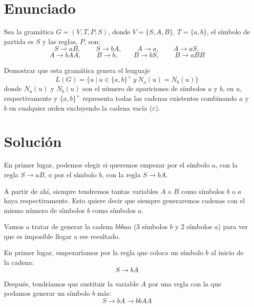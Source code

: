 \documentclass[10pt,a4paper,spanish]{report}
\begin{document}
\section{\textcolor{p1}Enunciado}
Sea la gramática $G = (V,T,P,S)$, donde $V = \{S,A,B\}$, $T = \{a,b\}$, el símbolo de partida es $S$ y las reglas, $P$, son:
\begin{displaymath}
S \rightarrow aB, \qquad\ S \rightarrow bA, \qquad\ A \rightarrow a, \qquad A \rightarrow aS,
\end{displaymath}
\begin{displaymath}
A \rightarrow bAA, \qquad\ B \rightarrow b, \qquad\ B \rightarrow bS, \qquad\ B \rightarrow aBB
\end{displaymath}

Demostrar que esta gramática genera el lenguaje
\begin{displaymath}
  L(G) = \{u~ | ~u \in \{a,b\}^+ ~y~ N_a(u) = N_b(u) \}
\end{displaymath}
donde $N_a(u)$ y $N_b(u)$ son el número de apariciones de símbolos $a$ y $b$, en $u$, respectivamente y $\{a,b\}^+$ representa todas las cadenas existentes combinando $a$ y $b$ en cualquier orden excluyendo la cadena vacía ($\varepsilon$).

\section{\textcolor{p1}Solución}
En primer lugar, podemos elegir si queremos empezar por el símbolo $a$, con la regla $S \rightarrow aB$, o por el símbolo $b$, con la regla $S \rightarrow bA$.

A partir de ahí, siempre tendremos tantas variables $A$ o $B$ como símbolos $b$ o $a$ haya respectivamente. Esto quiere decir que siempre generaremos cadenas con el mismo número de símbolos $b$ como símbolos $a$.

Vamos a tratar de generar la cadena $bbbaa$ (3 símbolos $b$ y 2 símbolos $a$) para ver que es imposible llegar a ese resultado.

En primer lugar, empezaríamos por la regla que coloca un símbolo $b$ al inicio de la cadena:
\begin{displaymath}
S \rightarrow bA
\end{displaymath}

Después, tendríamos que sustituir la variable $A$ por una regla con la que podamos generar un símbolo $b$ más:
\begin{displaymath}
S \rightarrow bA \rightarrow bbAA
\end{displaymath}
\end{document}
